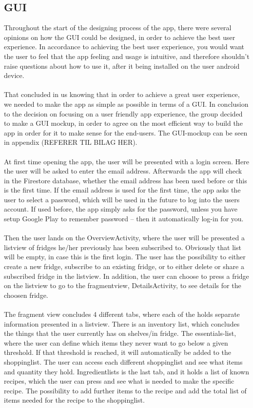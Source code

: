 \documentclass[12pt]{article}
\begin{document}
\subsection{GUI} 
Throughout the start of the designing process of the app, there were several opinions on how the GUI could be designed, in order to achieve the best user experience. In accordance to achieving the best user experience, you would want the user to feel that the app feeling and usage is intuitive, and therefore shouldn’t raise questions about how to use it, after it being installed on the user android device. 
\\
\\
That concluded in us knowing that in order to achieve a great user experience, we needed to make the app as simple as possible in terms of a GUI.
In conclusion to the decision on focusing on a user friendly app experience, the group decided to make a GUI mockup, in order to agree on the most efficient way to build the app in order for it to make sense for the end-users. The GUI-mockup can be seen in appendix (REFERER TIL BILAG HER).
\\
\\
At first time opening the app, the user will be presented with a login screen. Here the user will be asked to enter the email address. Afterwards the app will check in the Firestore database, whether the email address has been used before or this is the first time. If the email address is used for the first time, the app asks the user to select a password, which will be used in the future to log into the users account. If used before, the app simply asks for the password, unless you have setup Google Play to remember password – then it automatically log-in for you.
\\
\\
Then the user lands on the OverviewActivity, where the user will be presented a listview of fridges he/her previously has been subscribed to. Obviously that list will be empty, in case this is the first login. The user has the possibility to either create a new fridge, subscribe to an existing fridge, or to either delete or share a subscribed fridge in the listview. In addition, the user can choose to press a fridge on the listview to go to the fragmentview, DetailsActivity, to see details for the choosen fridge.
\\
\\
The fragment view concludes 4 different tabs, where each of the holds separate information presented in a listview. There is an inventory list, which concludes the things that the user currently has on shelves/in fridge. The essentials-list, where the user can define which items they never want to go below a given threshold. If that threshold is reached, it will automatically be added to the shoppinglist. The user can access each different shoppinglist and see what items and quantity they hold. Ingredientlists is the last tab, and it holds a list of known recipes, which the user can press and see what is needed to make the specific recipe. The possibility to add further items to the recipe and add the total list of items needed for the recipe to the shoppinglist.
\end{document}
